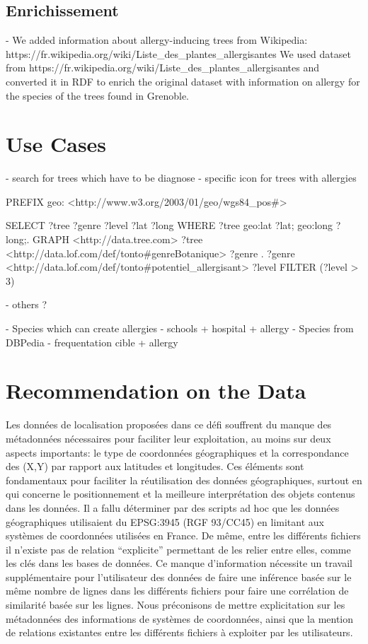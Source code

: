 \documentclass[a4paper,pagenum,english]{rnti}
\begin{document}
{\subsection{Enrichissement}
	- We added information about allergy-inducing trees from Wikipedia: https://fr.wikipedia.org/wiki/Liste_des_plantes_allergisantes
We used dataset from https://fr.wikipedia.org/wiki/Liste_des_plantes_allergisantes and converted it in RDF to enrich the original dataset with information on allergy for the species of the trees found in Grenoble. 

\section{Use Cases}
- search for trees which have to be diagnose
- specific icon for trees with allergies

PREFIX geo: <http://www.w3.org/2003/01/geo/wgs84_pos#>

SELECT ?tree ?genre ?level ?lat ?long
WHERE {
  ?tree geo:lat ?lat;
        geo:long ?long;.
  GRAPH <http://data.tree.com> {
    ?tree <http://data.lof.com/def/tonto#genreBotanique> ?genre .
    ?genre <http://data.lof.com/def/tonto#potentiel_allergisant> ?level }
  FILTER (?level > 3)
}

- others ?

- Species which can create allergies
- schools + hospital + allergy
- Species from DBPedia
- frequentation cible + allergy

\section{Recommendation on the Data}
Les données de localisation proposées dans ce défi souffrent du manque des métadonnées nécessaires pour faciliter leur exploitation, au moins sur deux aspects importants: le type de coordonnées géographiques et la correspondance des (X,Y) par rapport aux latitudes et longitudes. Ces éléments sont fondamentaux pour faciliter la réutilisation des données géographiques, surtout en qui concerne le positionnement et la meilleure interprétation des objets contenus dans les données. Il a fallu déterminer par des scripts ad hoc que les données géographiques utilisaient du EPSG:3945 (RGF 93/CC45) en limitant aux systèmes de coordonnées utilisées en France. 
De même, entre les différents fichiers il n’existe pas de relation “explicite” permettant de les relier entre elles, comme les clés dans les bases de données. Ce manque d’information nécessite un travail supplémentaire pour l’utilisateur des données de faire une inférence basée sur le même nombre de lignes dans les différents fichiers pour faire une corrélation de similarité basée sur les lignes.
Nous préconisons de mettre explicitation sur les métadonnées des informations de systèmes de coordonnées, ainsi que la mention de relations existantes entre les différents fichiers à exploiter par les utilisateurs. 

}
\end{document}
